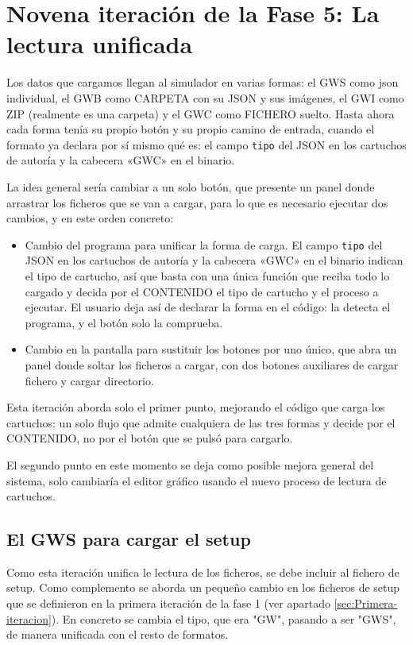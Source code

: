 \section{Novena iteración de la Fase 5: La lectura unificada}
\label{sec:F5I9}

Los datos que cargamos llegan al simulador en varias formas: el GWS como json individual, el GWB como CARPETA
con su JSON y sus imágenes, el GWI como ZIP (realmente es una
carpeta) y el GWC como FICHERO suelto. Hasta ahora cada forma
tenía su propio botón y su propio camino de entrada, cuando el
formato ya declara por sí mismo qué es: el campo \texttt{tipo} del
JSON en los cartuchos de autoría y la cabecera «GWC» en el binario.

La idea general sería cambiar a un solo botón, que presente
un panel donde arrastrar los ficheros que se van a cargar, para lo que es
necesario ejecutar dos cambios, y en este orden concreto:

\begin{itemize}
	\item Cambio del programa para unificar la forma de carga. El campo
	\texttt{tipo} del JSON en los cartuchos de autoría y la cabecera
	«GWC» en el binario indican el tipo de cartucho, así que basta con
	una única función que reciba todo lo cargado y decida por el
	CONTENIDO el tipo de cartucho y el proceso a ejecutar. El usuario
	deja así de declarar la forma en el código: la detecta el
	programa, y el botón solo la comprueba.
	
	\item Cambio en la pantalla para sustituir los botones por uno
	único, que abra un panel donde soltar los ficheros a cargar, con
	dos botones auxiliares de cargar fichero y cargar directorio.
\end{itemize}

Esta iteración aborda solo el primer punto, mejorando el código que carga los
cartuchos: un solo flujo que admite cualquiera de las tres formas y decide por
el CONTENIDO, no por el botón que se pulsó para cargarlo.

El segundo punto en este momento se deja como posible mejora general del
sistema, solo cambiaría el editor gráfico usando el nuevo proceso de lectura
de cartuchos.

\subsection{El GWS para cargar el setup}
\label{sec:F5I9GWS}
Como esta iteración unifica le lectura de los ficheros, se debe incluir al 
fichero de setup. Como complemento se aborda un pequeño cambio en los ficheros 
de setup que se definieron en la primera iteración de la fase 1 (ver apartado 
\ref{sec:Primera-iteracion}). En concreto se cambia el tipo, que era "GW", 
pasando a ser "GWS", de manera unificada con el resto de formatos.

